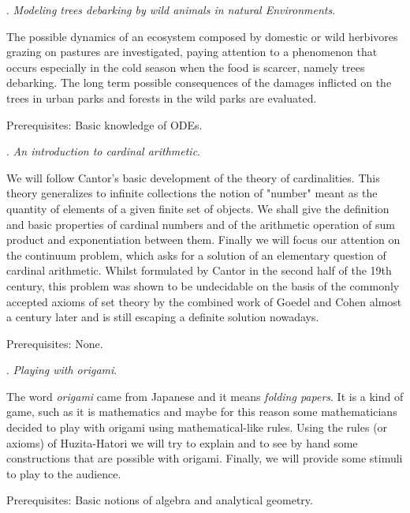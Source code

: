 \documentclass{article}
\def\noi{\noindent}
\begin{document}
\noi {\bf Ezio Venturino}.
{\it Modeling trees debarking by wild animals in natural Environments}.

\noi The possible dynamics of an ecosystem composed by domestic or wild herbivores grazing on pastures are investigated, paying attention to a phenomenon that occurs especially in the cold season when the food is scarcer, namely trees debarking. The long term possible consequences of the damages inflicted on the trees in urban parks and forests in the wild parks are evaluated.

\noi Prerequisites: Basic knowledge of ODEs.

\vspace{22.9pt}


\noi {\bf Matteo Viale}.
{\it An introduction to cardinal arithmetic}.

\noi We will follow Cantor's basic development of the theory of cardinalities. This theory generalizes to infinite collections the notion of "number" meant as the quantity of elements of a given finite set of objects. We shall give the definition and basic properties of cardinal numbers and of the arithmetic operation of sum product and
exponentiation between them.
Finally we will focus our attention on the continuum problem, which asks for a solution of an elementary question of cardinal arithmetic. Whilst formulated by Cantor in the second half of the 19th century, this problem was shown to be undecidable on the basis of the commonly accepted axioms of set theory by the combined work of Goedel and Cohen almost a century later and is still escaping a definite solution nowadays.

\noi Prerequisites: None.

\vspace{22.9pt}

\noi {\bf Andrea Villa}. 
{\it Playing with origami}. 

\noi The word \textit{origami} came from  Japanese and it means \textit{folding papers}. It is a kind of game, such as it is mathematics and  maybe for this reason some mathematicians decided to play with origami using mathematical-like rules.
Using the rules (or axioms) of Huzita-Hatori we will try to explain and to see by hand some constructions that are possible with origami. Finally, we will provide some stimuli to play to the audience.

\noi Prerequisites: Basic notions of algebra and analytical geometry.
\end{document}

